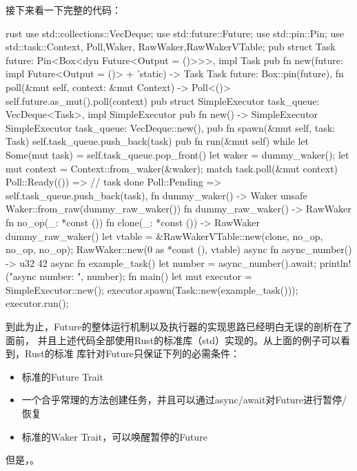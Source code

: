 接下来看一下完整的代码：
\begin{code-block}{rust}
use std::collections::VecDeque;
use std::future::Future;
use std::pin::Pin;
use std::task::{Context, Poll,Waker, RawWaker,RawWakerVTable};
pub struct Task {
    future: Pin<Box<dyn Future<Output = ()>>>,
}
impl Task {
    pub fn new(future: impl Future<Output = ()> + 'static) -> Task {
        Task {
            future: Box::pin(future),
        }
    }
    fn poll(&mut self, context: &mut Context) -> Poll<()> {
        self.future.as_mut().poll(context)
    }
}
pub struct SimpleExecutor {
    task_queue: VecDeque<Task>,
}
impl SimpleExecutor {
    pub fn new() -> SimpleExecutor {
        SimpleExecutor {
            task_queue: VecDeque::new(),
        }
    }
    pub fn spawn(&mut self, task: Task) {
        self.task_queue.push_back(task)
    }
    pub fn run(&mut self) {
        while let Some(mut task) = self.task_queue.pop_front() {
            let waker = dummy_waker();
            let mut context = Context::from_waker(&waker);
            match task.poll(&mut context) {
                Poll::Ready(()) => {} // task done
                Poll::Pending => self.task_queue.push_back(task),
            }
        }
    }
}
fn dummy_waker() -> Waker {
    unsafe { Waker::from_raw(dummy_raw_waker()) }
}
fn dummy_raw_waker() -> RawWaker {
    fn no_op(_: *const ()) {}
    fn clone(_: *const ()) -> RawWaker {
        dummy_raw_waker()
    }
    let vtable = &RawWakerVTable::new(clone, no_op, no_op, no_op);
    RawWaker::new(0 as *const (), vtable)
}
async fn async_number() -> u32 {
    42
}
async fn example_task() {
    let number = async_number().await;
    println!("async number: {}", number);
}
fn main() {
    let mut executor = SimpleExecutor::new();
    executor.spawn(Task::new(example_task()));
    executor.run();
}
\end{code-block}

到此为止，Future的整体运行机制以及执行器的实现思路已经明白无误的剖析在了面前，
并且上述代码全部使用Rust的标准库（std）实现的。从上面的例子可以看到，Rust的标准
库针对Future只保证下列的必需条件：
\begin{itemize}
  \item 标准的Future Trait
  \item 一个合乎常理的方法创建任务，并且可以通过async/await对Future进行暂停/恢复
  \item 标准的Waker Trait，可以唤醒暂停的Future
\end{itemize}
但是，。

